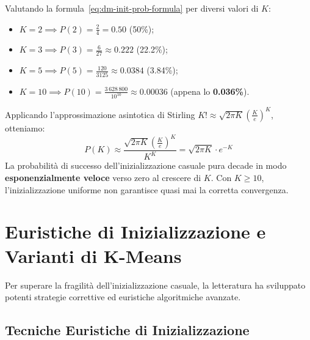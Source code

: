 Valutando la formula~\eqref{eq:dm-init-prob-formula} per diversi valori di $K$:
\begin{itemize}[noitemsep]
    \item $K = 2 \implies P(2) = \frac{2}{4} = 0.50$ (50\%);
    \item $K = 3 \implies P(3) = \frac{6}{27} \approx 0.222$ (22.2\%);
    \item $K = 5 \implies P(5) = \frac{120}{3125} \approx 0.0384$ (3.84\%);
    \item $K = 10 \implies P(10) = \frac{3\,628\,800}{10^{10}} \approx 0.00036$ (appena lo \textbf{0.036\%}).
\end{itemize}

Applicando l'approssimazione asintotica di Stirling $K! \approx \sqrt{2\pi K} \left(\frac{K}{e}\right)^K$, otteniamo:
\begin{equation}
    P(K) \approx \frac{\sqrt{2\pi K} \left(\frac{K}{e}\right)^K}{K^K} = \sqrt{2\pi K} \cdot e^{-K}
\end{equation}
La probabilità di successo dell'inizializzazione casuale pura decade in modo \textbf{esponenzialmente veloce} verso zero al crescere di $K$. Con $K \ge 10$, l'inizializzazione uniforme non garantisce quasi mai la corretta convergenza.

\FloatBarrier
\section{Euristiche di Inizializzazione e Varianti di K-Means}
\label{sec:dm-kmeans-heuristics-variants}

Per superare la fragilità dell'inizializzazione casuale, la letteratura ha sviluppato potenti strategie correttive ed euristiche algoritmiche avanzate.

\FloatBarrier
\subsection{Tecniche Euristiche di Inizializzazione}


